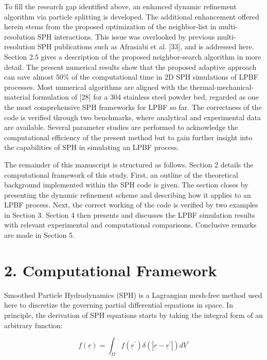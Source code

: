 \documentclass[10pt]{article}
\begin{document}
To fill the research gap identified above, an enhanced dynamic refinement algorithm via particle splitting is developed. The additional enhancement offered herein stems from the proposed optimization of the neighbor-list in multi-resolution SPH interactions. This issue was overlooked by previous multi-resolution SPH publications such as Afrasiabi et al. [33], and is addressed here. Section 2.5 gives a description of the proposed neighbor-search algorithm in more detail. The present numerical results show that the proposed adaptive approach can save almost $50 \%$ of the computational time in $2 \mathrm{D}$ SPH simulations of LPBF processes. Most numerical algorithms are aligned with the thermal-mechanical-material formulation of [28] for a 304 stainless steel powder bed, regarded as one the most comprehensive SPH frameworks for LPBF so far. The correctness of the code is verified through two benchmarks, where analytical and experimental data are available. Several parameter studies are performed to acknowledge the computational efficiency of the present method but to gain further insight into the capabilities of SPH in simulating an LPBF process.

The remainder of this manuscript is structured as follows. Section 2 details the computational framework of this study. First, an outline of the theoretical background implemented within the SPH code is given. The section closes by presenting the dynamic refinement scheme and describing how it applies to an LPBF process. Next, the correct working of the code is verified by two examples in Section 3. Section 4 then presents and discusses the LPBF simulation results with relevant experimental and computational comparisons. Conclusive remarks are made in Section 5.

\section*{2. Computational Framework}
Smoothed Particle Hydrodynamics (SPH) is a Lagrangian mesh-free method used here to discretize the governing partial differential equations in space. In principle, the derivation of SPH equations starts by taking the integral form of an arbitrary function:


\begin{equation*}
f(\underline{r})=\int_{\Omega} f\left(\underline{r}^{\prime}\right) \delta\left(\left|\underline{r}-\underline{r}^{\prime}\right|\right) d V^{\prime} \tag{1}
\end{equation*}
\end{document}
